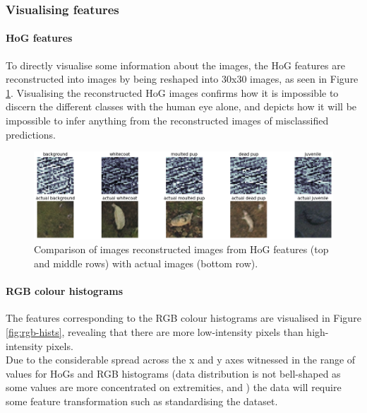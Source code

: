 \documentclass[letterpaper,12pt]{article}
\begin{document}
\subsubsection{Visualising features}

\paragraph{HoG features}

To directly visualise some information about the images, the HoG features are reconstructed into images by being reshaped into 30x30 images, as seen in Figure \ref{fig:hog_multi}. Visualising the reconstructed HoG images confirms how it is impossible to discern the different classes with the human eye alone, and depicts how it will be impossible to infer anything from the reconstructed images of misclassified predictions.

\begin{figure}[h]
\centerline{\includegraphics[width=\textwidth]{report/figures/hog_multi.png}}
\caption{\label{fig:hog_multi}Comparison of images reconstructed images from HoG features (top and middle rows) with actual images (bottom row).}
\end{figure}

\paragraph{RGB colour histograms}

The features corresponding to the RGB colour histograms are visualised in Figure \ref{fig:rgb-hists}, revealing that there are more low-intensity pixels than high-intensity pixels.\\

Due to the considerable spread across the x and y axes witnessed in the range of values for HoGs and RGB histograms (data distribution is not bell-shaped  as some values are more concentrated on extremities, and ) the data will require some feature transformation such as standardising the dataset.
\end{document}
